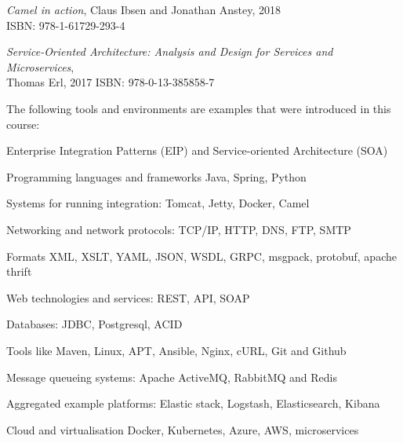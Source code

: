 \documentclass[Screen16to9,17pt]{foils}
\begin{document}


\emph{Camel in action}, Claus Ibsen and Jonathan Anstey, 2018\\
ISBN: 978-1-61729-293-4



\emph{Service‑Oriented Architecture: Analysis and Design for Services and Microservices},\\ Thomas Erl, 2017
ISBN: 978-0-13-385858-7



The following tools and environments are examples that were introduced in this course:

\begin{list2}
\item Enterprise Integration Patterns (EIP) and Service-oriented Architecture (SOA)
\item Programming languages and frameworks Java, Spring, Python
\item Systems for running integration: Tomcat, Jetty, Docker, Camel
\item Networking and network protocols: TCP/IP, HTTP, DNS, FTP, SMTP
\item Formats XML, XSLT, YAML, JSON, WSDL, GRPC, msgpack, protobuf, apache thrift
\item Web technologies and services: REST, API, SOAP
\item Databases: JDBC, Postgresql, ACID
\item Tools like Maven, Linux, APT, Ansible, Nginx, cURL, Git and Github
\item Message queueing systems: Apache ActiveMQ, RabbitMQ and Redis
\item Aggregated example platforms: Elastic stack, Logstash, Elasticsearch, Kibana
\item Cloud and virtualisation Docker, Kubernetes, Azure, AWS, microservices
\end{list2}






\end{document}

